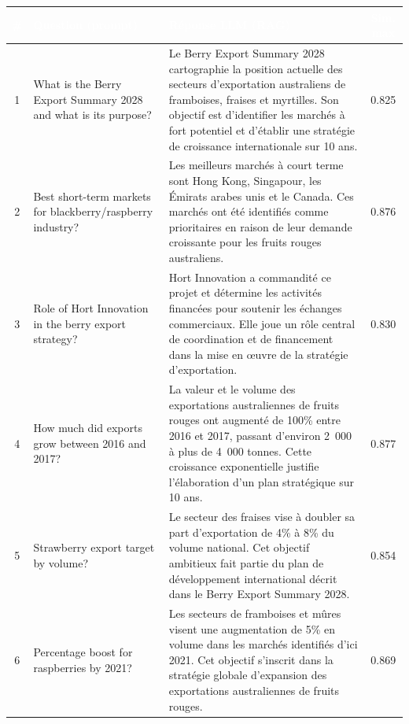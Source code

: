 \documentclass[12pt,a4paper]{report}
\begin{document}
\vspace{8pt}
\begin{center}
\small
\begin{tabular}{|c|p{4cm}|p{7cm}|c|}
  \hline
  \rowcolor{mainblue}
  \textcolor{white}{\textbf{\#}} &
  \textcolor{white}{\textbf{Question (prompt)}} &
  \textcolor{white}{\textbf{Réponse LLM (RAG)}} &
  \textcolor{white}{\textbf{Sim. max}} \\
  \hline
  1 & What is the Berry Export Summary 2028 and what is its purpose? &
      Le Berry Export Summary 2028 cartographie la position actuelle des secteurs
      d'exportation australiens de framboises, fraises et myrtilles. Son objectif est
      d'identifier les marchés à fort potentiel et d'établir une stratégie de
      croissance internationale sur 10 ans. & 0.825 \\
  \rowcolor{lightblue}
  2 & Best short-term markets for blackberry/raspberry industry? &
      Les meilleurs marchés à court terme sont Hong Kong, Singapour, les Émirats
      arabes unis et le Canada. Ces marchés ont été identifiés comme prioritaires
      en raison de leur demande croissante pour les fruits rouges australiens. & 0.876 \\
  3 & Role of Hort Innovation in the berry export strategy? &
      Hort Innovation a commandité ce projet et détermine les activités financées
      pour soutenir les échanges commerciaux. Elle joue un rôle central de
      coordination et de financement dans la mise en œuvre de la stratégie
      d'exportation. & 0.830 \\
  \rowcolor{lightblue}
  4 & How much did exports grow between 2016 and 2017? &
      La valeur et le volume des exportations australiennes de fruits rouges ont
      augmenté de 100\% entre 2016 et 2017, passant d'environ 2~000 à plus de
      4~000 tonnes. Cette croissance exponentielle justifie l'élaboration d'un
      plan stratégique sur 10 ans. & 0.877 \\
  5 & Strawberry export target by volume? &
      Le secteur des fraises vise à doubler sa part d'exportation de 4\% à 8\%
      du volume national. Cet objectif ambitieux fait partie du plan de
      développement international décrit dans le Berry Export Summary 2028. & 0.854 \\
  \rowcolor{lightblue}
  6 & Percentage boost for raspberries by 2021? &
      Les secteurs de framboises et mûres visent une augmentation de 5\% en volume
      dans les marchés identifiés d'ici 2021. Cet objectif s'inscrit dans la
      stratégie globale d'expansion des exportations australiennes de fruits
      rouges. & 0.869 \\
  \hline
\end{tabular}
\end{center}
\end{document}
